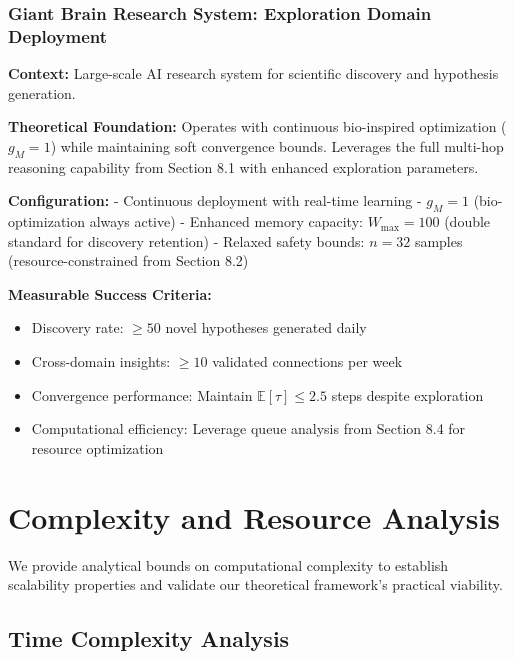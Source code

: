\documentclass{article}
\begin{document}
\subsubsection{Giant Brain Research System: Exploration Domain Deployment}

\textbf{Context:} Large-scale AI research system for scientific discovery and hypothesis generation.

\textbf{Theoretical Foundation:} Operates with continuous bio-inspired optimization ($g_M = 1$) while maintaining soft convergence bounds. Leverages the full multi-hop reasoning capability from Section 8.1 with enhanced exploration parameters.

\textbf{Configuration:}
- Continuous deployment with real-time learning
- $g_M = 1$ (bio-optimization always active)  
- Enhanced memory capacity: $W_{\max} = 100$ (double standard for discovery retention)
- Relaxed safety bounds: $n = 32$ samples (resource-constrained from Section 8.2)

\textbf{Measurable Success Criteria:}
\begin{itemize}
\item Discovery rate: $\geq 50$ novel hypotheses generated daily
\item Cross-domain insights: $\geq 10$ validated connections per week
\item Convergence performance: Maintain $\mathbb{E}[\tau] \leq 2.5$ steps despite exploration
\item Computational efficiency: Leverage queue analysis from Section 8.4 for resource optimization
\end{itemize}

\section{Complexity and Resource Analysis}
\label{sec:complexity_analysis}

We provide analytical bounds on computational complexity to establish scalability properties and validate our theoretical framework's practical viability.

\subsection{Time Complexity Analysis}
\end{document}
